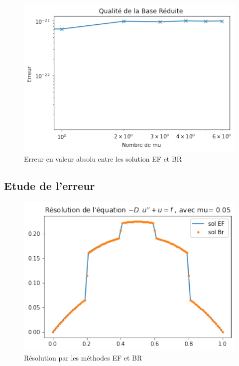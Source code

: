 \documentclass[12pt]{article}
\begin{document}
\begin{figure}
\begin{center}
\includegraphics[scale=1]{qual_br.pdf}
\caption[]{Erreur en valeur absolu entre les solution EF et BR }
\end{center}
\end{figure}

\subsection{Etude de l'erreur }


\begin{figure}[h]
\begin{center}
\includegraphics[scale=1]{sol_br_ef.pdf}
\caption[]{Résolution par les méthodes EF et BR }
\end{center}
\end{figure}
\end{document}
